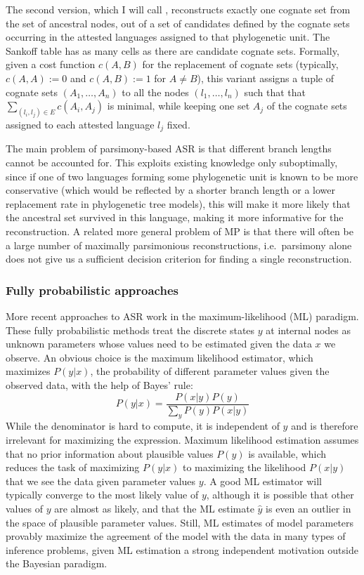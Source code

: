 The second version, which I will call \textit{}, reconstructs exactly one cognate set from the set of ancestral nodes, out of a set of candidates defined by the cognate sets occurring in the attested languages assigned to that phylogenetic unit. The Sankoff table has as many cells as there are candidate cognate sets. Formally, given a cost function $c(A,B)$ for the replacement of cognate sets (typically, $c(A,A) := 0$ and $c(A,B) := 1$ for $A \neq B$), this variant assigns a tuple of cognate sets $(A_1,\dots,A_n)$ to all the nodes $(l_1,\dots,l_n)$ such that that $\sum_{(l_i,l_j) \in E} c(A_i,A_j)$ is minimal, while keeping one set $A_j$ of the cognate sets  assigned to each attested language $l_j$ fixed.

The main problem of parsimony-based ASR is that different branch lengths cannot be accounted for. This exploits existing knowledge only suboptimally, since if one of two languages forming some phylogenetic unit is known to be more conservative (which would be reflected by a shorter branch length or a lower replacement rate in phylogenetic tree models), this will make it more likely that the ancestral set survived in this language, making it more informative for the reconstruction. A related more general problem of MP is that there will often be a large number of maximally parsimonious reconstructions, i.e.\ parsimony alone does not give us a sufficient decision criterion for finding a single reconstruction.

\subsubsection{Fully probabilistic approaches}
More recent approaches to ASR work in the maximum-likelihood (ML) paradigm. These fully probabilistic methods treat the discrete states $y$ at internal nodes as unknown parameters whose values need to be estimated given the data $x$ we observe. An obvious choice is the maximum likelihood estimator, which maximizes $P(y|x)$, the probability of different parameter values given the observed data, with the help of Bayes' rule:
\begin{equation*}
 P(y|x) = \frac{P(x|y)P(y)}{\sum_y P(y)P(x|y)}
\end{equation*}
While the denominator is hard to compute, it is independent of $y$ and is therefore irrelevant for maximizing the expression. Maximum likelihood estimation assumes that no prior information about plausible values $P(y)$ is available, which reduces the task of maximizing $P(y|x)$ to maximizing the likelihood $P(x|y)$ that we see the data given parameter values $y$. A good ML estimator will typically converge to the most likely value of $y$, although it is possible that other values of $y$ are almost as likely, and that the ML estimate $\hat{y}$ is even an outlier in the space of plausible parameter values. Still, ML estimates of model parameters provably maximize the agreement of the model with the data in many types of inference problems, given ML estimation a strong independent motivation outside the Bayesian paradigm.

